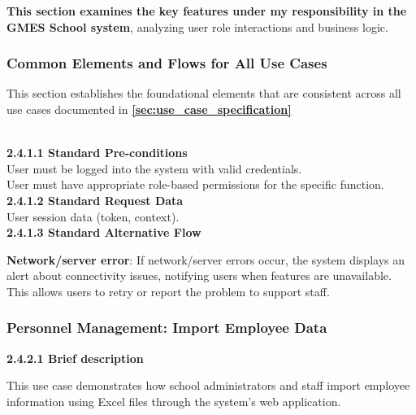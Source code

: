 \indent

\textbf{This section examines the key features under my responsibility in the GMES School system}, analyzing user role interactions and business logic.
\subsubsection{Common Elements and Flows for All Use Cases}\label{sec:common_usecase}
\par\indent\indent\parbox{0.9\textwidth}{
    This section establishes the foundational elements that are consistent across all use cases documented in \textbf{\autoref{sec:use_case_specification} }
}\\[0.25cm]
\indent\textbf{2.4.1.1 Standard Pre-conditions}\\
\indent\indent User must be logged into the system with valid credentials.\\
\indent\indent User must have appropriate role-based permissions for the specific function.\\[0.2cm]
\indent\textbf{2.4.1.2 Standard Request Data}\\
\indent\indent User session data (token, context).\\[0.2cm]
\indent\textbf{2.4.1.3 Standard Alternative Flow}
\vspace{0.2cm}
\par\indent\indent\parbox{0.9\textwidth}{\textbf{Network/server error}: If network/server errors occur, the system displays an alert about connectivity issues, notifying users when features are unavailable. This allows users to retry or report the problem to support staff.}

\subsubsection{Personnel Management: Import Employee Data}
\indent\indent\textbf{2.4.2.1 Brief description}
\vspace{0.5em}
\par\indent\indent\parbox{0.9\textwidth}{
    This use case demonstrates how school administrators and staff import employee information using Excel files through the system's web application.
}\\

